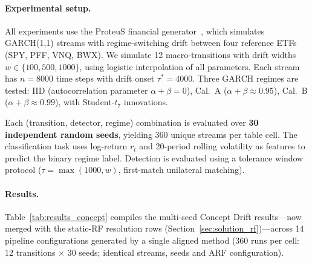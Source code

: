 \documentclass[smallextended]{svjour3}
\begin{document}
\paragraph{Experimental setup.}
All experiments use the ProteuS financial generator~\cite{suarez_cetrulo_proteus_2025}, which simulates GARCH(1,1) streams with regime-switching drift between four reference ETFs (SPY, PFF, VNQ, BWX).
We simulate 12 macro-transitions with drift widths $w \in \{100, 500, 1000\}$, using logistic interpolation of all parameters.
Each stream has $n = 8000$ time steps with drift onset $\tau^* = 4000$.
Three GARCH regimes are tested: IID (autocorrelation parameter $\alpha + \beta = 0$), Cal.~A ($\alpha + \beta \approx 0.95$), Cal.~B ($\alpha + \beta \approx 0.99$), with Student-$t_7$ innovations.

Each (transition, detector, regime) combination is evaluated over \textbf{30 independent random seeds}, yielding 360 unique streams per table cell.
The classification task uses log-return $r_t$ and 20-period rolling volatility as features to predict the binary regime label.
Detection is evaluated using a tolerance window protocol ($\tau = \max(1000, w)$, first-match unilateral matching).

\paragraph{Results.}
Table~\ref{tab:results_concept} compiles the multi-seed Concept Drift results---now merged with the static-RF resolution rows (Section~\ref{sec:solution_rf})---across 14 pipeline configurations generated by a single aligned method (360 runs per cell: 12 transitions $\times$ 30 seeds; identical streams, seeds and ARF configuration).


\end{document}
